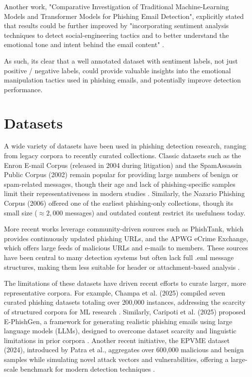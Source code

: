 Another work, "Comparative Investigation of Traditional Machine-Learning Models and Transformer Models for Phishing Email Detection", explicitly stated that results could be further improved by "incorporating sentiment analysis techniques to detect social-engineering tactics and to better understand the emotional tone and intent behind the email content" \cite{electronics13244877}.

As such, its clear that a well annotated dataset with sentiment labels, not just positive / negative labels, could provide valuable insights into the emotional manipulation tactics used in phishing emails, and potentially improve detection performance.

\section{Datasets}

A wide variety of datasets have been used in phishing detection research, ranging from legacy corpora to recently curated collections. Classic datasets such as the Enron E-mail Corpus (released in 2004 during litigation) and the SpamAssassin Public Corpus (2002) remain popular for providing large numbers of benign or spam-related messages, though their age and lack of phishing-specific samples limit their representativeness in modern studies \cite{metsis2006spam,klimt2004enron}. Similarly, the Nazario Phishing Corpus (2006) offered one of the earliest phishing-only collections, though its small size ($\approx 2,000$ messages) and outdated content restrict its usefulness today.

More recent works leverage community-driven sources such as PhishTank, which provides continuously updated phishing URLs, and the \ac{APWG} eCrime Exchange, which offers large feeds of malicious URLs and e-mails to members. These sources have been central to many detection systems but often lack full .eml message structures, making them less suitable for header or attachment-based analysis \cite{mahmoud2023phishing}.

The limitations of these datasets have driven recent efforts to curate larger, more representative corpora. For example, Champa et al. (2025) compiled seven curated phishing datasets totaling over 200,000 instances, addressing the scarcity of structured corpora for ML research \cite{champa2025curated}. Similarly, Caripoti et al. (2025) proposed E-PhishGen, a framework for generating realistic phishing emails using large language models (LLMs), designed to overcome dataset scarcity and linguistic limitations in prior corpora \cite{caripoti2025ephishgen}. Another recent initiative, the EPVME dataset (2024), introduced by Patra et al., aggregates over 600,000 malicious and benign samples while simulating novel attack vectors and vulnerabilities, offering a large-scale benchmark for modern detection techniques \cite{patra2024epvme}.

